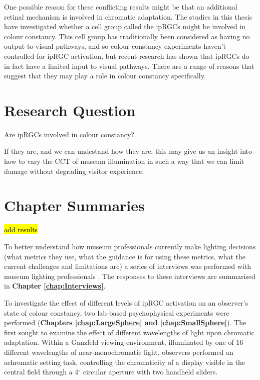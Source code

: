 One possible reason for these conflicting results might be that an additional retinal mechanism is involved in chromatic adaptation. The studies in this thesis have investigated whether a cell group called the \glspl{ipRGC} might be involved in colour constancy. This cell group has traditionally been considered as having no output to visual pathways, and so colour constancy experiments haven't controlled for \gls{ipRGC} activation, but recent research has shown that \glspl{ipRGC} do in fact have a limited input to visual pathways. There are a range of reasons that suggest that they may play a role in colour constancy specifically.

\section{Research Question}

Are ipRGCs involved in colour constancy?

If they are, and we can undestand how they are, this may give us an insight into how to vary the \gls{CCT} of museum illumination in such a way that we can limit damage without degrading visitor experience.

\section{Chapter Summaries}

\hl{add results} 

To better understand how museum professionals currently make lighting decisions (what metrics they use, what the guidance is for using these metrics, what the current challenges and limitations are) a series of interviews was performed with museum lighting professionals \citep{garside_interviewing_2016}. The responses to these interviews are summarised in \textbf{Chapter \ref{chap:Interviews}}.

To investigate the effect of different levels of \gls{ipRGC} activation on an observer's state of colour constancy, two lab-based psychophysical experiments were performed (\textbf{Chapters \ref{chap:LargeSphere} and \ref{chap:SmallSphere}}). The first sought to examine the effect of different wavelengths of light upon chromatic adaptation. Within a Ganzfeld viewing environment, illuminated by one of 16 different wavelengths of near-monochromatic light, observers performed an achromatic setting task, controlling the chromaticity of a display visible in the central field through a 4$^{\circ}$ circular aperture with two handheld sliders.


